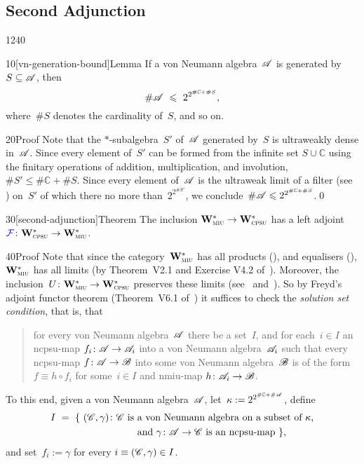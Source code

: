 \subsection{Second Adjunction}
\begin{parsec}{1240}%
\begin{point}{10}[vn-generation-bound]{Lemma}%
If a von Neumann algebra~$\mathscr{A}$
is generated by~$S\subseteq \mathscr{A}$,
then
\begin{equation*}
\#\scrA \ \leq\  2^{2^{\#\mathbb{C}+\#S}},
\end{equation*}
where~$\#S$ denotes the cardinality of~$S$, and so on.
\begin{point}{20}{Proof}%
Note that the
$*$-subalgebra~$S'$ of~$\mathscr{A}$
generated by~$S$
is ultraweakly dense in~$\mathscr{A}$.
Since every element of~$S'$
can be formed
from the infinite set $S\cup \mathbb{C}$ using 
the finitary operations
of
addition, multiplication,
and
involution,
$\#S'\leq \#\mathbb{C}+ \#S$.
Since every element of~$\mathscr{A}$
is the ultraweak limit of a filter
(see \cite[\S12]{willard})
on~$S'$
of which there no more than~$2^{2^{\#S'}}$,
we conclude~$\#\mathscr{A} \leqslant 2^{2^{\#\mathbb{C}+\#S}}$.\qed
\end{point}
\end{point}
\begin{point}{30}[second-adjunction]{Theorem}%
The inclusion $\mathbf{W}^*_{\text{\textsc{miu}}}\to\mathbf{W}^*_{\text{\textsc{cpsu}}}$
has a left adjoint $\Define{\mathcal{F}}\colon \W{cpsu}\to\W{miu}$.%
\begin{point}{40}{Proof}%
Note that since the category~$\mathbf{W}^*_{\text{\textsc{miu}}}$
has all products (),
and equalisers (),
$\mathbf{W}^*_{\text{\textsc{miu}}}$ has all limits 
(by Theorem~V2.1 and Exercise V4.2 of~\cite{maclane}).
Moreover, the inclusion~$U\colon \mathbf{W}^*_{\text{\textsc{miu}}}\to\mathbf{W}^*_{\text{\textsc{cpsu}}}$
preserves these limits (see~ and~).
So by Freyd's adjoint functor theorem (Theorem~V6.1 of~\cite{maclane})
it suffices to check the \emph{solution set condition},
that is,
that 
\begin{quote}
for every von Neumann algebra~$\mathscr{A}$
there 
be a set~$I$,
and for each~$i\in I$ an ncpsu-map $f_i\colon \mathscr{A}\to\mathscr{A}_i$
into a von Neumann algebra~$\mathscr{A}_i$
such that every ncpsu-map $f\colon \mathscr{A}\to \mathscr{B}$
into some von Neumann algebra~$\mathscr{B}$
is of the form~$ f\equiv h\circ f_i$
for some~$i\in I$ and nmiu-map $h\colon \mathscr{A}_i\to\mathscr{B}$.
\end{quote}
To this end, given a von Neumann algebra~$\mathscr{A}$,
let~$\kappa:=2^{2^{\#\mathbb{C}+\#\mathscr{A}}}$, define
\begin{alignat*}{3}
	I\ = \ \{\ (\mathscr{C},\gamma)\colon \mathscr{C}\text{ is }&
	\text{a von Neumann algebra
	on a subset of~$\kappa$,}\\
&\text{and $\gamma \colon \mathscr{A}\to\mathscr{C}$ is an ncpsu-map} \ \},
\end{alignat*}
and set~$f_i := \gamma$ for every $i\equiv(\mathscr{C},\gamma)\in I$.


\end{point}
\end{point}
\end{parsec}
